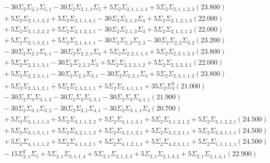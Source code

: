 \documentclass[12pt]{article}
\begin{document}
\begin{landscape}
\begin{align*}
		&\quad\quad -30\Sigma_{2}\Sigma_{2,1}\Sigma_{5,1}-30\Sigma_{2}\Sigma_{2,1,1}\Sigma_{5}+5\Sigma_{2}\Sigma_{2,1,1,1,4}+5\Sigma_{2}\Sigma_{2,1,1,2,3}(23.800) \\ 
		&\quad\quad +5\Sigma_{2}\Sigma_{2,1,1,3,2}+5\Sigma_{2}\Sigma_{2,1,1,4,1}-30\Sigma_{2}\Sigma_{2,1,2}\Sigma_{4}+5\Sigma_{2}\Sigma_{2,1,2,1,3}(22.000) \\ 
		&\quad\quad +5\Sigma_{2}\Sigma_{2,1,2,2,2}+5\Sigma_{2}\Sigma_{2,1,2,3,1}-30\Sigma_{2}\Sigma_{2,1,3}\Sigma_{3}+5\Sigma_{2}\Sigma_{2,1,3,1,2}(22.000) \\ 
		&\quad\quad +5\Sigma_{2}\Sigma_{2,1,3,2,1}+5\Sigma_{2}\Sigma_{2,1,4,1,1}-30\Sigma_{2}\Sigma_{2,2}\Sigma_{2,3}-30\Sigma_{2}\Sigma_{2,2}\Sigma_{3,2}(23.200) \\ 
		&\quad\quad -30\Sigma_{2}\Sigma_{2,2}\Sigma_{4,1}-30\Sigma_{2}\Sigma_{2,2,1}\Sigma_{4}+5\Sigma_{2}\Sigma_{2,2,1,1,3}+5\Sigma_{2}\Sigma_{2,2,1,2,2}(23.800) \\ 
		&\quad\quad +5\Sigma_{2}\Sigma_{2,2,1,3,1}-30\Sigma_{2}\Sigma_{2,2,2}\Sigma_{3}+5\Sigma_{2}\Sigma_{2,2,2,1,2}+5\Sigma_{2}\Sigma_{2,2,2,2,1}(22.000) \\ 
		&\quad\quad +5\Sigma_{2}\Sigma_{2,2,3,1,1}-30\Sigma_{2}\Sigma_{2,3}\Sigma_{3,1}-30\Sigma_{2}\Sigma_{2,3,1}\Sigma_{3}+5\Sigma_{2}\Sigma_{2,3,1,1,2}(23.800) \\ 
		&\quad\quad +5\Sigma_{2}\Sigma_{2,3,1,2,1}+5\Sigma_{2}\Sigma_{2,3,2,1,1}+5\Sigma_{2}\Sigma_{2,4,1,1,1}+35\Sigma_{2}\Sigma_{3}^{3}(21.000) \\ 
		&\quad\quad -30\Sigma_{2}\Sigma_{3}\Sigma_{3,1,2}-30\Sigma_{2}\Sigma_{3}\Sigma_{3,2,1}-30\Sigma_{2}\Sigma_{3}\Sigma_{4,1,1}(21.900) \\ 
		&\quad\quad -30\Sigma_{2}\Sigma_{3,1}\Sigma_{3,2}-30\Sigma_{2}\Sigma_{3,1}\Sigma_{4,1}-30\Sigma_{2}\Sigma_{3,1,1}\Sigma_{4}(20.700) \\ 
		&\quad\quad +5\Sigma_{2}\Sigma_{3,1,1,1,3}+5\Sigma_{2}\Sigma_{3,1,1,2,2}+5\Sigma_{2}\Sigma_{3,1,1,3,1}+5\Sigma_{2}\Sigma_{3,1,2,1,2}+5\Sigma_{2}\Sigma_{3,1,2,2,1}(24.500) \\ 
		&\quad\quad +5\Sigma_{2}\Sigma_{3,1,3,1,1}+5\Sigma_{2}\Sigma_{3,2,1,1,2}+5\Sigma_{2}\Sigma_{3,2,1,2,1}+5\Sigma_{2}\Sigma_{3,2,2,1,1}+5\Sigma_{2}\Sigma_{3,3,1,1,1}(24.500) \\ 
		&\quad\quad +5\Sigma_{2}\Sigma_{4,1,1,1,2}+5\Sigma_{2}\Sigma_{4,1,1,2,1}+5\Sigma_{2}\Sigma_{4,1,2,1,1}+5\Sigma_{2}\Sigma_{4,2,1,1,1}+5\Sigma_{2}\Sigma_{5,1,1,1,1}(24.500) \\ 
		&\quad\quad -15\Sigma_{2,1}^{2}\Sigma_{5}+5\Sigma_{2,1}\Sigma_{2,1,1,4}+5\Sigma_{2,1}\Sigma_{2,1,2,3}+5\Sigma_{2,1}\Sigma_{2,1,3,2}+5\Sigma_{2,1}\Sigma_{2,1,4,1}(22.900) \\ 

\end{align*}
\end{landscape}
\end{document}
